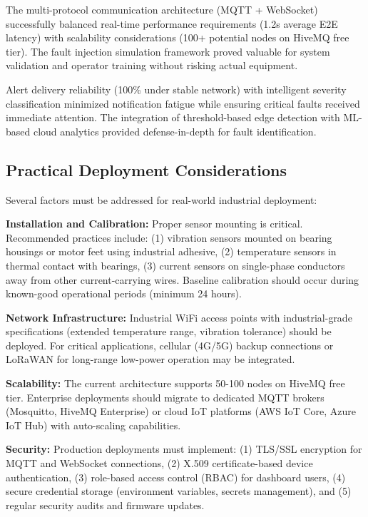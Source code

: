 \documentclass[conference]{IEEEtran}
\begin{document}
The multi-protocol communication architecture (MQTT + WebSocket) successfully balanced real-time performance requirements (1.2s average E2E latency) with scalability considerations (100+ potential nodes on HiveMQ free tier). The fault injection simulation framework proved valuable for system validation and operator training without risking actual equipment.

Alert delivery reliability (100\% under stable network) with intelligent severity classification minimized notification fatigue while ensuring critical faults received immediate attention. The integration of threshold-based edge detection with ML-based cloud analytics provided defense-in-depth for fault identification.

\subsection{Practical Deployment Considerations}

Several factors must be addressed for real-world industrial deployment:

\textbf{Installation and Calibration:} Proper sensor mounting is critical. Recommended practices include: (1) vibration sensors mounted on bearing housings or motor feet using industrial adhesive, (2) temperature sensors in thermal contact with bearings, (3) current sensors on single-phase conductors away from other current-carrying wires. Baseline calibration should occur during known-good operational periods (minimum 24 hours).

\textbf{Network Infrastructure:} Industrial WiFi access points with industrial-grade specifications (extended temperature range, vibration tolerance) should be deployed. For critical applications, cellular (4G/5G) backup connections or LoRaWAN for long-range low-power operation may be integrated.

\textbf{Scalability:} The current architecture supports 50-100 nodes on HiveMQ free tier. Enterprise deployments should migrate to dedicated MQTT brokers (Mosquitto, HiveMQ Enterprise) or cloud IoT platforms (AWS IoT Core, Azure IoT Hub) with auto-scaling capabilities.

\textbf{Security:} Production deployments must implement: (1) TLS/SSL encryption for MQTT and WebSocket connections, (2) X.509 certificate-based device authentication, (3) role-based access control (RBAC) for dashboard users, (4) secure credential storage (environment variables, secrets management), and (5) regular security audits and firmware updates.
\end{document}
